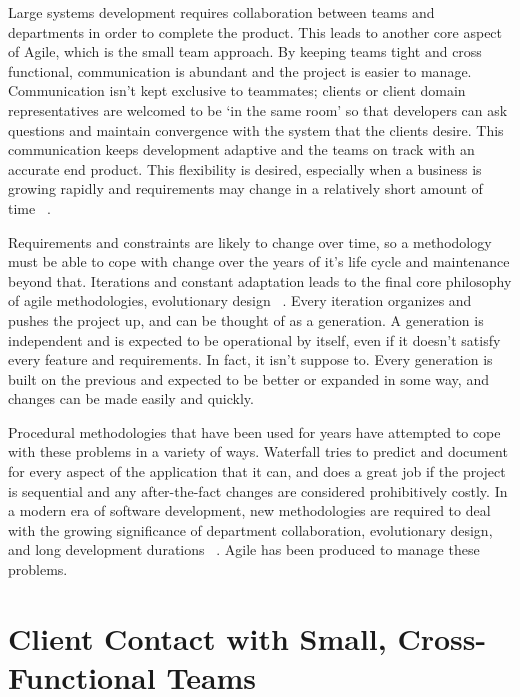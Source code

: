 \documentclass[11pt]{article}
\newcommand{\tab}{\hspace*{2em}}
\begin{document}
\begin{doublespace}
\tab Large systems development requires collaboration between teams and departments in order to complete the product. This leads to another core aspect of Agile, which is the small team approach. By keeping teams tight and cross functional, communication is abundant and the project is easier to manage. Communication isn’t kept exclusive to teammates; clients or client domain representatives are welcomed to be ‘in the same room’ so that developers can ask questions and maintain convergence with the system that the clients desire. This communication keeps development adaptive and the teams on track with an accurate end product. This flexibility is desired, especially when a business is growing rapidly and requirements may change in a relatively short amount of time ~\cite{Ktata:2009:ADI:1557626.1557636}.
    
\tab  Requirements and constraints are likely to change over time, so a methodology must be able to cope with change over the years of it’s life cycle and maintenance beyond that. Iterations and constant adaptation leads to the final core philosophy of agile methodologies, evolutionary design ~\cite{Janus:2012:TCA:2237796.2237803}. Every iteration organizes and pushes the project up, and can be thought of as a generation. A generation is independent and is expected to be operational by itself, even if it doesn’t satisfy every feature and requirements. In fact, it isn’t suppose to. Every generation is built on the previous and expected to be better or expanded in some way, and changes can be made easily and quickly. 
    
\tab Procedural methodologies that have been used for years have attempted to cope with these problems in a variety of ways. Waterfall tries to predict and document for every aspect of the application that it can, and does a great job if the project is sequential and any after-the-fact changes are considered prohibitively costly. In a modern era of software development, new methodologies are required to deal with the growing significance of department collaboration, evolutionary design, and long development durations ~\cite{Ktata:2009:ADI:1557626.1557636}. Agile has been produced to manage these problems. 

\section{Client Contact with Small, Cross-Functional Teams}


\end{doublespace}
\end{document}
